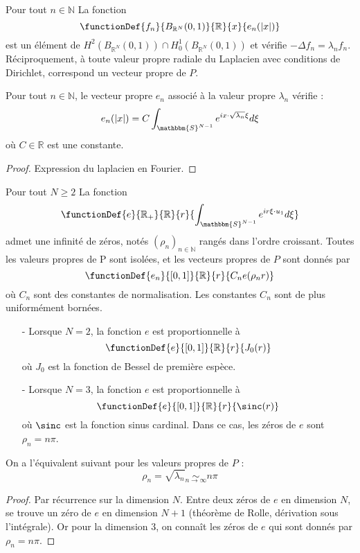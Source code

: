 \documentclass[11pt,a4paper]{article}
\begin{document}
\begin{Prop}
Pour tout $n \in \mathbb{N}$ La fonction \[\functionDef{f_n}{B_{\mathbb{R}^N}(0,1)}{\mathbb{R}}{x}{e_n(|x|)}\]
est un élément de $H^2(B_{\mathbb{R}^N}(0,1))\cap H^1_0(B_{\mathbb{R}^N}(0,1))$ et vérifie $- \Delta f_n = \lambda_n f_n$. Réciproquement, à toute valeur propre radiale du Laplacien avec conditions de Dirichlet, correspond un vecteur propre de $P$. 
\end{Prop}

\begin{Prop} Pour tout $n\in\mathbb{N}$, le vecteur propre $e_n$ associé à la valeur propre $\lambda_n$ vérifie : \[e_n(|x|) = C\int_{\mathbbm{S}^{N-1}}e^{i x \cdot \sqrt{\lambda_n}\xi }d\xi\] où $C\in \mathbb{R}$ est une constante. 
\begin{proof}
Expression du laplacien en Fourier. 
\end{proof}

\end{Prop}

\begin{Cor} Pour tout $N \geq 2$
La fonction \[\functionDef{e}{\mathbb{R}_+}{\mathbb{R}}{r}{\int_{\mathbbm{S}^{N-1}}e^{i r \xi \cdot u_1}d\xi}\] admet une infinité de zéros, notés $(\rho_n)_{n\in\mathbb{N}}$ rangés dans l'ordre croissant. Toutes les valeurs propres de P sont isolées, et les vecteurs propres de $P$ sont donnés par \[\functionDef{e_n}{[0,1]}{\mathbb{R}}{r}{C_ne(\rho_n r)}\] où $C_n$ sont des constantes de normalisation. Les constantes $C_n$ sont de plus uniformément bornées. 
\end{Cor}

\begin{Prop} \text{ }

\begin{itemize}
\item[-]Lorsque $N=2$, la fonction $e$ est proportionnelle à \[\functionDef{e}{[0,1]}{\mathbb{R}}{r}{J_0(r)}\] où $J_0$ est la fonction de Bessel de première espèce. 
\item[-] Lorsque $N=3$, la fonction $e$ est proportionnelle à \[\functionDef{e}{[0,1]}{\mathbb{R}}{r}{\sinc(r)}\] où $\sinc$ est la fonction sinus cardinal. Dans ce cas, les zéros de $e$ sont $\rho_n = n\pi$. 
\end{itemize}

\end{Prop}

\begin{Prop}
On a l'équivalent suivant pour les valeurs propres de $P$ : \[\rho_n = \sqrt{\lambda_n} \underset{n\to \infty}{\sim} n\pi \]
\begin{proof}
Par récurrence sur la dimension $N$. Entre deux zéros de $e$ en dimension $N$, se trouve un zéro de $e$ en dimension $N+1$ (théorème de Rolle, dérivation sous l'intégrale). Or pour la dimension $3$, on connaît les zéros de $e$ qui sont donnés par $\rho_n = n\pi$.
\end{proof}
\end{Prop}
\end{document}
